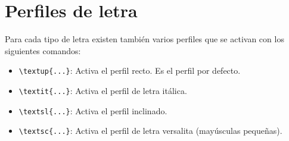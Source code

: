 \documentclass[
  a4paper,
]{scrreport}
\providecommand{\tightlist}{%
  \setlength{\itemsep}{0pt}\setlength{\parskip}{0pt}}\usepackage{longtable,booktabs,array}
\theoremstyle{definition}
\theoremstyle{remark}
\begin{document}
\section{Perfiles de letra}\label{perfiles-de-letra}

Para cada tipo de letra existen también varios perfiles que se activan
con los siguientes comandos:

\begin{itemize}
\tightlist
\item
  \texttt{\textbackslash{}textup\{...\}}: Activa el perfil recto. Es el
  perfil por defecto.
\item
  \texttt{\textbackslash{}textit\{...\}}: Activa el perfil de letra
  itálica.
\item
  \texttt{\textbackslash{}textsl\{...\}}: Activa el perfil inclinado.
\item
  \texttt{\textbackslash{}textsc\{...\}}: Activa el perfil de letra
  versalita (mayúsculas pequeñas).
\end{itemize}
\end{document}
